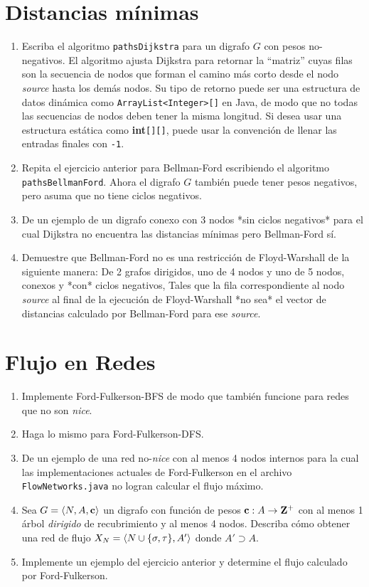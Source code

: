 \documentclass{amsart}
\begin{document}
\begin{large}
\section{Distancias mínimas}

\begin{enumerate}
    \item Escriba el algoritmo \texttt{pathsDijkstra} para un digrafo $G$ con pesos no-negativos. El algoritmo ajusta Dijkstra para retornar la ``matriz'' cuyas filas son la secuencia de nodos que forman el camino más corto desde el nodo \emph{source} hasta los demás nodos. Su tipo de retorno puede ser una estructura de datos dinámica como \texttt{ArrayList<Integer>[]} en Java, de modo que no todas las secuencias de nodos deben tener la misma longitud. Si desea usar una estructura estática como \textbf{int}\texttt{[][]}, puede usar la convención de llenar las entradas finales con \texttt{-1}.
    \item Repita el ejercicio anterior para Bellman-Ford escribiendo el algoritmo \texttt{pathsBellmanFord}. Ahora el digrafo $G$ también puede tener pesos negativos, pero asuma que no tiene ciclos negativos.
    \item De un ejemplo de un digrafo conexo con 3 nodos *sin ciclos negativos* para el cual Dijkstra no encuentra las distancias mínimas pero Bellman-Ford sí.
    \item Demuestre que Bellman-Ford no es una restricción de Floyd-Warshall de la siguiente manera: De 2 grafos dirigidos, uno de 4 nodos y uno de 5 nodos, conexos y *con* ciclos negativos, Tales que la fila correspondiente al nodo \emph{source} al final de la ejecución de Floyd-Warshall *no sea* el vector de distancias calculado por Bellman-Ford para ese \emph{source}.
\end{enumerate}

\section{Flujo en Redes}

\begin{enumerate}
    \item Implemente Ford-Fulkerson-BFS de modo que también funcione para redes que no son \emph{nice}.
    \item Haga lo mismo para Ford-Fulkerson-DFS.
    \item De un ejemplo de una red no-\emph{nice} con al menos 4 nodos internos para la cual las implementaciones actuales de Ford-Fulkerson en el archivo \texttt{FlowNetworks.java} no logran calcular el flujo máximo.
    \item Sea $G = \langle N, A, \mathbf{c} \rangle$ un digrafo con función de pesos $\mathbf{c}: A \to \mathbf{Z}^{+}$ con al menos 1 árbol \emph{dirigido} de recubrimiento y al menos 4 nodos. Describa cómo obtener una red de flujo $X_N = \langle N \cup \{\sigma, \tau\}, A' \rangle$ donde $A' \supset A$.
    \item Implemente un ejemplo del ejercicio anterior y determine el flujo calculado por Ford-Fulkerson.
\end{enumerate}


\end{large}
\end{document}
